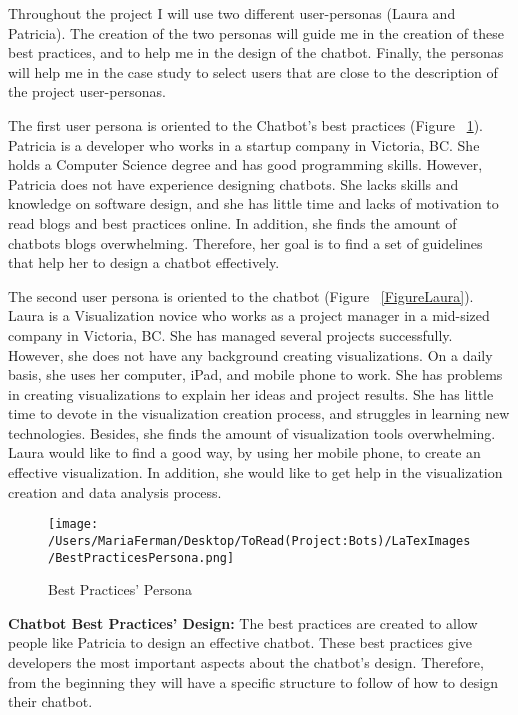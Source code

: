 \documentclass[a4paper,10pt]{article}
\begin{document}
 
Throughout the project I will use two different user-personas (Laura and Patricia). The creation of the two personas will guide me in the creation of these best practices, and to help me in the design of the chatbot. Finally, the personas will help me in the case study to select users that are close to the description of the project user-personas. 

The first user persona is oriented to the Chatbot's best practices (Figure ~\ref{FigurePatricia}). Patricia is a developer who works in a startup company in Victoria, BC. She holds a Computer Science degree and has good programming skills. However, Patricia does not have experience designing chatbots. She lacks skills and knowledge on software design, and she has little time and lacks of motivation to read blogs and best practices online. In addition, she finds the amount of chatbots blogs overwhelming. Therefore, her goal is to find a set of guidelines that help her to design a chatbot effectively. 

The second user persona is oriented to the chatbot (Figure ~\ref{FigureLaura}). Laura is a Visualization novice who works as a project manager in a mid-sized company in Victoria, BC. She has managed several projects successfully. However, she does not have any background creating visualizations. On a daily basis, she uses her computer, iPad, and mobile phone to work. She has problems in creating visualizations to explain her ideas and project results. She has little time to devote in the visualization creation process, and struggles in learning new technologies. Besides, she finds the amount of visualization tools overwhelming. Laura would like to find a good way, by using her mobile phone, to create an effective visualization. In addition, she would like to get help in the visualization creation and data analysis process.  
\begin{figure}
\centering
\texttt{[image: /Users/MariaFerman/Desktop/ToRead(Project:Bots)/LaTexImages/BestPracticesPersona.png]}
\caption{Best Practices' Persona}
\label{FigurePatricia}
\end{figure}

\textbf{Chatbot Best Practices' Design:} The best practices are created to allow people like Patricia to design an effective chatbot. These best practices give developers the most important aspects about the chatbot's design. Therefore, from the beginning they will have a specific structure to follow of how to design their chatbot.
\end{document}
